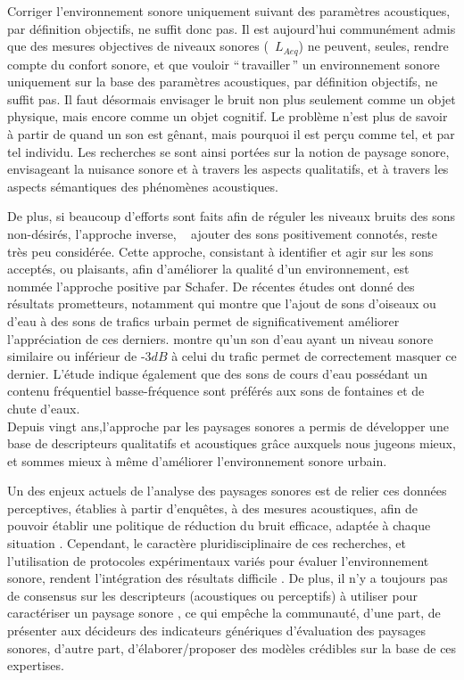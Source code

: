 Corriger l'environnement sonore uniquement suivant des paramètres acoustiques, par définition objectifs, ne suffit donc pas. Il est aujourd'hui communément admis que des mesures objectives de niveaux sonores (\eg~$L_{Aeq}$) ne peuvent, seules, rendre compte du confort sonore, et que vouloir ``\,travailler\,'' un environnement sonore uniquement sur la base des paramètres acoustiques, par définition objectifs, ne suffit pas\citep{yang2005acoustic,schulte2006soundscape,kang2010semantic,aletta2016soundscape}. Il faut désormais envisager le bruit non plus seulement comme un objet physique, mais encore comme un objet cognitif\citep{guastavino_etude_2003}. Le problème n'est plus de savoir à partir de quand un son est gênant, mais pourquoi il est perçu comme tel, et par tel individu. Les recherches se sont ainsi portées sur la notion de paysage sonore, envisageant la nuisance sonore et à travers les aspects qualitatifs, et à travers les aspects sémantiques des phénomènes acoustiques.

De plus, si beaucoup d’efforts sont faits afin de réguler les niveaux bruits des sons non-désirés,  l'approche inverse, \ie~ ajouter des sons positivement connotés, reste très peu considérée. Cette approche, consistant à identifier et agir sur les sons acceptés, ou plaisants, afin d'améliorer la qualité d'un environnement, est nommée l'approche positive par Schafer. De récentes études ont donné des résultats prometteurs, notamment \citep{hong2013designing} qui montre que l'ajout de sons d'oiseaux ou d'eau à des sons de trafics urbain permet de significativement améliorer l'appréciation de ces derniers. \citep{galbrun2012perceptual} montre qu'un son d'eau ayant un niveau sonore similaire ou inférieur de -3$dB$ à celui du trafic permet de correctement masquer ce dernier. L'étude indique également que des sons de cours d'eau possédant un contenu fréquentiel basse-fréquence sont préférés aux sons de fontaines et de chute d'eaux.\\

Depuis vingt ans,l'approche par les paysages sonores a permis de développer une base de descripteurs qualitatifs et acoustiques grâce auxquels nous jugeons mieux, et sommes mieux à même d'améliorer l'environnement sonore urbain.  \citep{kang2006urban,schulte2007soundscape}

Un des enjeux actuels de l'analyse des paysages sonores est de relier ces données perceptives, établies à partir d'enquêtes, à des mesures acoustiques, afin de pouvoir établir une politique de réduction du bruit efficace, adaptée à chaque situation \citep{schulte2013soundscape}.
Cependant, le caractère pluridisciplinaire de ces recherches, et l'utilisation de protocoles expérimentaux variés pour évaluer l'environnement sonore, rendent l’intégration des résultats difficile \citep{davies2013perception}. De plus, il n'y a toujours pas de consensus sur les descripteurs (acoustiques ou perceptifs) à utiliser pour caractériser un paysage sonore \citep{brocolini2012prediction,aletta2016soundscape}, ce qui empêche la communauté, d'une part, de présenter aux décideurs des indicateurs génériques d'évaluation des paysages sonores, d'autre part, d'élaborer/proposer des modèles crédibles sur la base de ces expertises.

